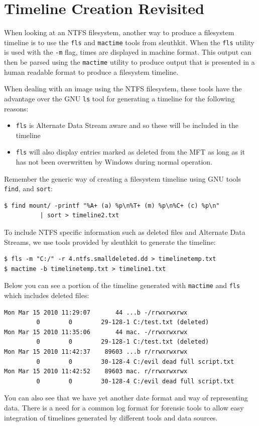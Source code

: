 \documentclass[a4paper,
    11pt,
    normalheadings,
    parindent,
    UKenglish,
    abstracton,
    ]{scrartcl}
\begin{document}
\section{Timeline Creation Revisited}

When looking at an NTFS filesystem, another way to produce a filesystem timeline is to use the \texttt{fls} and \texttt{mactime} tools from sleuthkit.
When the \texttt{fls} utility is used with the \texttt{-m} flag, times are displayed in machine format.
This output can then be parsed using the \texttt{mactime} utility to produce output that is presented in a human readable format to produce a filesystem timeline.


When dealing with an image using the NTFS filesystem, these tools have the advantage over the GNU \texttt{ls} tool for generating a timeline for the following reasons:
\begin{itemize}
        \item \texttt{fls} is Alternate Data Stream aware and so these will be included in the timeline
        \item \texttt{fls} will also display entries marked as deleted from the MFT as long as it has not been overwritten by Windows during normal operation.
\end{itemize}

Remember the generic way of creating a filesystem timeline using GNU tools \texttt{find}, and \texttt{sort}:
\begin{verbatim}
$ find mount/ -printf "%A+ (a) %p\n%T+ (m) %p\n%C+ (c) %p\n"
          | sort > timeline2.txt
\end{verbatim}

To include NTFS specific information such as deleted files and Alternate Data Streams, we use tools provided by sleuthkit to generate the timeline:
\begin{verbatim}
$ fls -m "C:/" -r 4.ntfs.smalldeleted.dd > timelinetemp.txt
$ mactime -b timelinetemp.txt > timeline1.txt
\end{verbatim}

Below you can see a portion of the timeline generated with \texttt{mactime} and \texttt{fls} which includes deleted files:
\begin{verbatim}
Mon Mar 15 2010 11:29:07       44 ...b -/rrwxrwxrwx
         0        0        29-128-1 C:/test.txt (deleted)
Mon Mar 15 2010 11:35:06       44 mac. -/rrwxrwxrwx
         0        0        29-128-1 C:/test.txt (deleted)
Mon Mar 15 2010 11:42:37    89603 ...b r/rrwxrwxrwx
         0        0        30-128-4 C:/evil dead full script.txt
Mon Mar 15 2010 11:42:52    89603 mac. r/rrwxrwxrwx
         0        0        30-128-4 C:/evil dead full script.txt
\end{verbatim}
You can also see that we have yet another date format and way of representing data.
There is a need for a common log format for forensic tools to allow easy integration of timelines generated by different tools and data sources.
\end{document}
